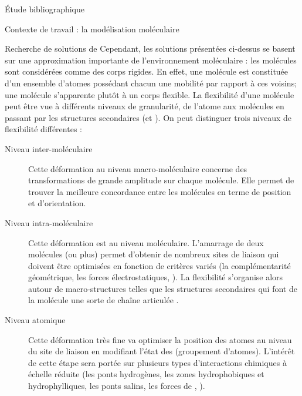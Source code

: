 \documentclass[myfrancais,ngerman,english,frenchb]{mythesis}
\begin{document}
\begin{mychapter}{Étude bibliographique}
\begin{mysection}{Contexte de travail : la modélisation moléculaire}
\begin{mysubsection}{Recherche de solutions de }
				Cependant, les solutions présentées ci-dessus se basent sur une approximation importante de l'environnement moléculaire : les molécules sont considérées comme des corps rigides.
				En effet, une molécule est constituée d'un ensemble d'atomes possédant chacun une mobilité par rapport à ces voisins; une molécule s'apparente plutôt à un corps flexible.
				La flexibilité d'une molécule peut être vue à différents niveaux de granularité, de l'atome aux molécules en passant par les structures secondaires (\myhelice* et \myfeuillet*).
				On peut distinguer trois niveaux de flexibilité différentes :
				\begin{description}
					\item[Niveau inter-moléculaire] Cette déformation au niveau macro-moléculaire concerne des transformations de grande amplitude sur chaque molécule.
						Elle permet de trouver la meilleure concordance entre les molécules en terme de position et d'orientation.
					\item[Niveau intra-moléculaire] Cette déformation est au niveau moléculaire.
						L'amarrage de deux molécules (ou plus) permet d'obtenir de nombreux sites de liaison qui doivent être optimisées en fonction de critères variés (la complémentarité géométrique, les forces électrostatiques, \myetc).
						La flexibilité s'organise alors autour de macro-structures telles que les structures secondaires qui font de la molécule une sorte de chaîne articulée .
					\item[Niveau atomique] Cette déformation très fine va optimiser la position des atomes au niveau du site de liaison en modifiant l'état des  (groupement d'atomes).
						L'intérêt de cette étape sera portée sur plusieurs types d'interactions chimiques à échelle réduite (les ponts hydrogènes, les zones hydrophobiques et hydrophylliques, les ponts salins, les forces de  , \myetc).
				\end{description}

				\begin{myfigure}
				\end{myfigure}


\end{mysubsection}
\end{mysection}
\end{mychapter}
\end{document}
